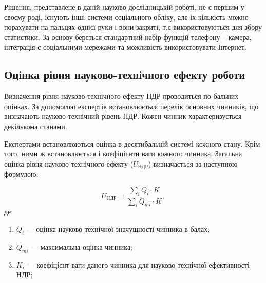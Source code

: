 Рішення, представлене в даній науково-дослідницькій роботі, не є першим у своєму роді, існують інші системи соціального обліку, але іх кількість можно порахувати на пальцях однієї руки і вони закриті, т.є використовуються для збору статистики. За основу береться стандартний набір функцій телефону – камера, інтеграція с соціальними мережами та можливість використовувати Інтернет.
    \subsection{Оцінка рівня науково-технічного ефекту роботи}
Визначення рівня науково-технічного ефекту НДР проводиться по бальних оцінках. За допомогою експертів встановлюється перелік основних чинників, що визначають науково-технічний рівень НДР. Кожен чинник характеризується декількома станами.

Експертами встановлюються оцінка в десятибальній системі кожного стану. Крім того, ними ж встановлюється і коефіцієнти ваги кожного чинника. Загальна оцінка рівня науково-технічного ефекту ($U_{\text{НДР}}$) визначається за наступною формулою:
  
\begin{equation}
U_{\text{НДР}} =  \frac{\sum \limits_{i} Q_i   \cdot   K}{\sum \limits_{i} Q_{mi}   \cdot   K}, \nonumber
\end{equation}
де: 
\begin{enumerate} 
\item \mbox{$ Q_i $} --- оцінка науково-технічної значущності чинника в балах;
\item \mbox{$ Q_{mi} $} --- максимальна оцінка чинника;
\item \mbox{$ K_i $} --- коефіцієнт ваги даного чинника для науково-технічної ефективності НДР;
\end{enumerate}

